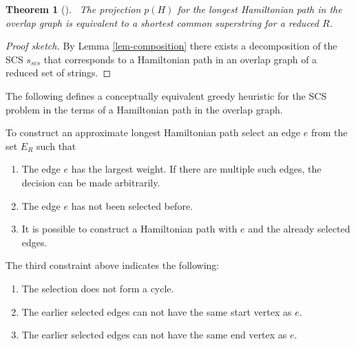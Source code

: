 \documentclass[english,twoside,censored,csm,algorithms-track-2020]{HYthesisML}
\theoremstyle{plain}
\newtheorem{theorem}{Theorem}[chapter]
\theoremstyle{definition}
\numberwithin{testexample}{chapter}
\begin{document}
\begin{theorem} [] ~\label{lem-similarity-between-SCS-Hamp}
  The projection $p(H)$ for the longest Hamiltonian path in the overlap graph is equivalent to
  a shortest common superstring for a reduced $R$.
\end{theorem}
\begin{proof}[Proof sketch]
By Lemma \ref{lem-composition} there exists a decomposition of the SCS $s_{scs}$ that corresponds to a
Hamiltonian path in an overlap graph of a reduced set of strings.
\end{proof}

The following defines a conceptually equivalent greedy heuristic for the SCS problem in the terms of
a Hamiltonian path in the overlap graph.

To  construct an approximate longest Hamiltonian path select an edge $e$ from the set $E_R$ such that

\begin{enumerate}
\item The edge $e$ has the largest weight. If there are multiple such edges, the decision can be made arbitrarily.
\item The edge $e$ has not been selected before.
\item It is possible to construct a Hamiltonian path with $e$ and the already selected edges. 
\end{enumerate}

The third constraint above indicates the following:
\begin{enumerate}[label=\roman*]
\item The selection does not form a cycle.
\item The earlier selected edges can not have the same start vertex as $e$.
\item The earlier selected edges can not have the same end vertex as $e$.
\end{enumerate}





\end{document}
